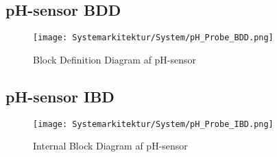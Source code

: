 
\subsection{pH-sensor BDD}

\begin{figure}[H]
	\centering
	\texttt{[image: Systemarkitektur/System/pH\_Probe\_BDD.png]}
	\label{fig:pH-sensor BDD}
	\caption{Block Definition Diagram af pH-sensor}
\end{figure}



\subsection{pH-sensor IBD}

\begin{figure}[H]
	\centering
	\texttt{[image: Systemarkitektur/System/pH\_Probe\_IBD.png]}
	\label{fig:pH-sensor IBD}
	\caption{Internal Block Diagram af pH-sensor}
\end{figure}


